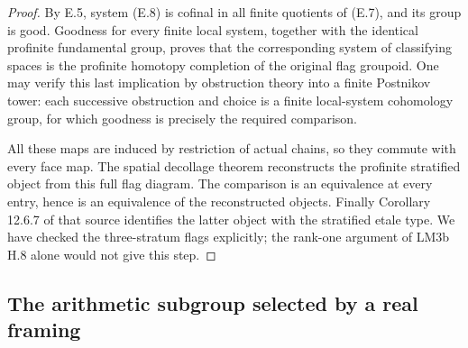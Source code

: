\begin{proof}
By E.5, system (E.8) is cofinal in all finite quotients of (E.7),
and its group is good.  Goodness for every finite local system,
together with the identical profinite fundamental group, proves that
the corresponding system of classifying spaces is the profinite
homotopy completion of the original flag groupoid.  One may verify
this last implication by obstruction theory into a finite Postnikov
tower: each successive obstruction and choice is a finite local-system
cohomology group, for which goodness is precisely the required
comparison.

All these maps are induced by restriction of actual chains, so they
commute with every face map.  The spatial decollage theorem
\cite[Theorem 2.7.4; Construction 2.8.8 and (2.8.9)]{ET_BGH2020}
reconstructs the profinite stratified object from this full flag
diagram.  The comparison is an equivalence at every entry, hence is
an equivalence of the reconstructed objects.  Finally Corollary
12.6.7 of that source identifies the latter object with the
stratified etale type.  We have checked the three-stratum flags
explicitly; the rank-one argument of LM3b H.8 alone would not give
this step.
\end{proof}

\subsection{The arithmetic subgroup selected by a real framing}

